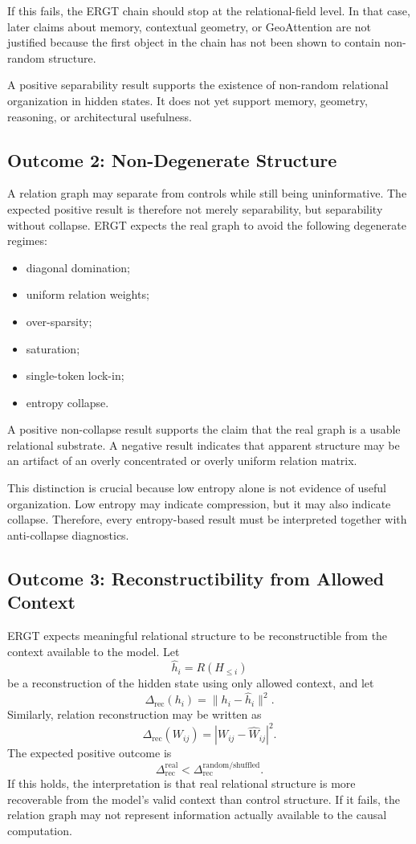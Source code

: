 \documentclass[11pt]{article}
\begin{document}
If this fails, the ERGT chain should stop at the relational-field level. In that case, later claims about memory, contextual geometry, or GeoAttention are not justified because the first object in the chain has not been shown to contain non-random structure.

\begin{ergtclaim}
A positive separability result supports the existence of non-random relational organization in hidden states. It does not yet support memory, geometry, reasoning, or architectural usefulness.
\end{ergtclaim}

\subsection{Outcome 2: Non-Degenerate Structure}

A relation graph may separate from controls while still being uninformative. The expected positive result is therefore not merely separability, but separability without collapse. ERGT expects the real graph to avoid the following degenerate regimes:
\begin{itemize}[leftmargin=2em]
    \item diagonal domination;
    \item uniform relation weights;
    \item over-sparsity;
    \item saturation;
    \item single-token lock-in;
    \item entropy collapse.
\end{itemize}

A positive non-collapse result supports the claim that the real graph is a usable relational substrate. A negative result indicates that apparent structure may be an artifact of an overly concentrated or overly uniform relation matrix.

This distinction is crucial because low entropy alone is not evidence of useful organization. Low entropy may indicate compression, but it may also indicate collapse. Therefore, every entropy-based result must be interpreted together with anti-collapse diagnostics.

\subsection{Outcome 3: Reconstructibility from Allowed Context}

ERGT expects meaningful relational structure to be reconstructible from the context available to the model. Let
\[
\hat{h}_i=R(H_{\leq i})
\]
be a reconstruction of the hidden state using only allowed context, and let
\[
\Delta_{\mathrm{rec}}(h_i)=\|h_i-\hat{h}_i\|^2.
\]
Similarly, relation reconstruction may be written as
\[
\Delta_{\mathrm{rec}}(W_{ij})=|W_{ij}-\hat{W}_{ij}|^2.
\]
The expected positive outcome is
\[
\Delta_{\mathrm{rec}}^{\mathrm{real}}
<
\Delta_{\mathrm{rec}}^{\mathrm{random/shuffled}}.
\]
If this holds, the interpretation is that real relational structure is more recoverable from the model's valid context than control structure. If it fails, the relation graph may not represent information actually available to the causal computation.
\end{document}
